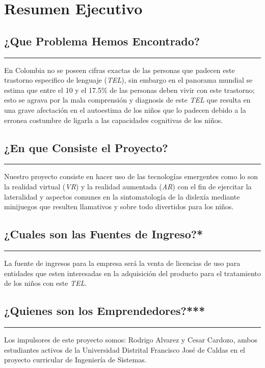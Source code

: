 \documentclass[12pt,letterpaper]{article}
\begin{document}
\section{Resumen Ejecutivo}
\subsection{¿Que Problema Hemos Encontrado?}
\rule{150mm}{0.1mm} 
En Colombia no se poseen cifras exactas de las personas que padecen este trastorno especifico de lenguaje (\textit{TEL}), sin embargo en el panorama mundial se estima que entre el 10 y el 17.5\% de las personas deben vivir con este trastorno; esto se agrava por la mala comprensión y diagnosis de este \textit{TEL} que resulta en una grave afectación en el autoestima de los niños que lo padecen debido a la erronea costumbre de ligarla a las capacidades cognitivas de los niños. \\

\subsection{¿En que Consiste el Proyecto?}
\rule{150mm}{0.1mm} 
Nuestro proyecto consiste en hacer uso de las tecnologías emergentes como lo son la realidad virtual (\textit{VR}) y la realidad aumentada (\textit{AR}) con el fin de ejercitar la lateralidad y aspectos comunes en la sintomatología de la dislexía mediante minijuegos que resulten llamativos y sobre todo divertidos para los niños.\\

\subsection{¿Cuales son las Fuentes de Ingreso?*}
\rule{150mm}{0.1mm} 
La fuente de ingresos para la empresa será la venta de licencias de uso para entidades que esten interesadas en la adquisición del producto para el tratamiento de los  niños con este \textit{TEL}.\\

\subsection{¿Quienes son los Emprendedores?***}
\rule{150mm}{0.1mm} 
Los impulsores de este proyecto somos:
Rodrigo Alvarez y Cesar Cardozo, ambos estudiantes activos de la Universidad Distrital Francisco José de Caldas en el proyecto curricular de Ingeniería de Sistemas.\\
\end{document}
